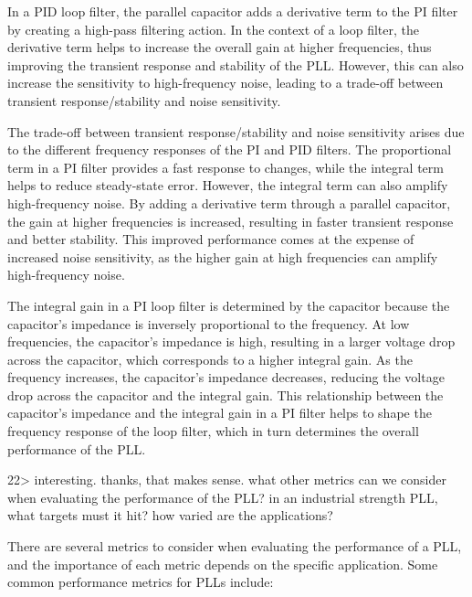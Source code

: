 \documentclass[
]{article}
\begin{document}
In a PID loop filter, the parallel capacitor adds a derivative term to
the PI filter by creating a high-pass filtering action. In the context
of a loop filter, the derivative term helps to increase the overall gain
at higher frequencies, thus improving the transient response and
stability of the PLL. However, this can also increase the sensitivity to
high-frequency noise, leading to a trade-off between transient
response/stability and noise sensitivity.

The trade-off between transient response/stability and noise sensitivity
arises due to the different frequency responses of the PI and PID
filters. The proportional term in a PI filter provides a fast response
to changes, while the integral term helps to reduce steady-state error.
However, the integral term can also amplify high-frequency noise. By
adding a derivative term through a parallel capacitor, the gain at
higher frequencies is increased, resulting in faster transient response
and better stability. This improved performance comes at the expense of
increased noise sensitivity, as the higher gain at high frequencies can
amplify high-frequency noise.

The integral gain in a PI loop filter is determined by the capacitor
because the capacitor's impedance is inversely proportional to the
frequency. At low frequencies, the capacitor's impedance is high,
resulting in a larger voltage drop across the capacitor, which
corresponds to a higher integral gain. As the frequency increases, the
capacitor's impedance decreases, reducing the voltage drop across the
capacitor and the integral gain. This relationship between the
capacitor's impedance and the integral gain in a PI filter helps to
shape the frequency response of the loop filter, which in turn
determines the overall performance of the PLL.

22\textgreater{} interesting. thanks, that makes sense. what other
metrics can we consider when evaluating the performance of the PLL? in
an industrial strength PLL, what targets must it hit? how varied are the
applications?

There are several metrics to consider when evaluating the performance of
a PLL, and the importance of each metric depends on the specific
application. Some common performance metrics for PLLs include:
\end{document}
